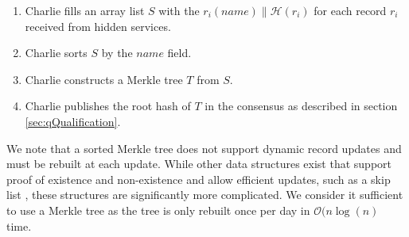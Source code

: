 \documentclass[USenglish,oneside,twocolumn]{article}
\newcommand*\concat{\mathbin{\|}}
\begin{document}
\begin{enumerate}
	\item Charlie fills an array list $ S $ with the $ r_{i}(\mathit{name}) \concat \mathcal{H}(r_{i}) $ for each record $ r_{i} $ received from hidden services.
	\item Charlie sorts $ S $ by the $ \mathit{name} $ field.
	\item Charlie constructs a Merkle tree $ T $ from $ S $.
	\item Charlie publishes the root hash of $ T $ in the consensus as described in section \ref{sec:qQualification}.
\end{enumerate}

We note that a sorted Merkle tree does not support dynamic record updates and must be rebuilt at each update. While other data structures exist that support proof of existence and non-existence and allow efficient updates, such as a skip list \cite{goodrich2001implementation}, these structures are significantly more complicated. We consider it sufficient to use a Merkle tree as the tree is only rebuilt once per day in $ \mathcal{O}(n \log(n) $ time.




\end{document}
